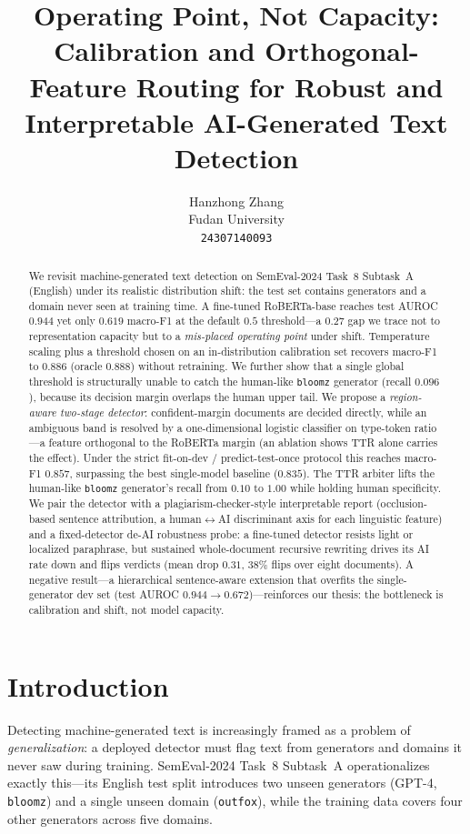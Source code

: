 \documentclass[11pt]{article}
\title{Operating Point, Not Capacity: Calibration and Orthogonal-Feature
Routing for Robust and Interpretable AI-Generated Text Detection}
\author{Hanzhong Zhang \\
  Fudan University \\
  \texttt{24307140093} \\}
\begin{document}
\maketitle

\begin{abstract}
We revisit machine-generated text detection on SemEval-2024 Task~8 Subtask~A
(English) under its realistic distribution shift: the test set contains
generators and a domain never seen at training time. A fine-tuned
RoBERTa-base reaches test AUROC $0.944$ yet only $0.619$ macro-F1 at the
default $0.5$ threshold---a $0.27$ gap we trace not to representation
capacity but to a \emph{mis-placed operating point} under shift. Temperature
scaling plus a threshold chosen on an in-distribution calibration set
recovers macro-F1 to $0.886$ (oracle $0.888$) without retraining. We further
show that a single global threshold is structurally unable to catch the
human-like \texttt{bloomz} generator (recall $0.096$), because its decision
margin overlaps the human upper tail. We propose a \emph{region-aware
two-stage detector}: confident-margin documents are decided directly, while
an ambiguous band is resolved by a one-dimensional logistic classifier on
type-token ratio---a feature orthogonal to the RoBERTa margin (an ablation
shows TTR alone carries the effect). Under the strict
fit-on-dev / predict-test-once protocol this reaches macro-F1 $0.857$,
surpassing the best single-model baseline ($0.835$). The TTR arbiter lifts the
human-like \texttt{bloomz} generator's recall from $0.10$ to $1.00$ while
holding human specificity. We pair the detector with a plagiarism-checker-style
interpretable report (occlusion-based sentence attribution, a
human$\leftrightarrow$AI discriminant axis for each linguistic feature) and a
fixed-detector de-AI robustness probe: a fine-tuned detector resists light or
localized paraphrase, but sustained whole-document recursive rewriting drives
its AI rate down and flips verdicts (mean drop $0.31$, $38\%$ flips over eight
documents). A negative result---a hierarchical
sentence-aware extension that overfits the single-generator dev set
(test AUROC $0.944\!\rightarrow\!0.672$)---reinforces our thesis: the
bottleneck is calibration and shift, not model capacity.
\end{abstract}

\section{Introduction}

Detecting machine-generated text is increasingly framed as a problem of
\emph{generalization}: a deployed detector must flag text from generators and
domains it never saw during training. SemEval-2024 Task~8 Subtask~A
\citep{wang2024semeval} operationalizes exactly this---its English test split
introduces two unseen generators (GPT-4, \texttt{bloomz}) and a single unseen
domain (\texttt{outfox}), while the training data covers four other generators
across five domains.
\end{document}
